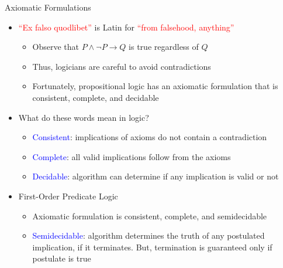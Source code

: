 \documentclass[10pt,english]{beamer}
\begin{document}
\begin{frame}{Axiomatic Formulations}

\begin{itemize}
\setlength\itemsep{3mm}
\item<1-> \textcolor{red}{``Ex falso quodlibet''} is Latin for \textcolor{red}{``from falsehood, anything''} \vspace{1mm}
\begin{itemize}
 \setlength\itemsep{1.5mm}
 \item Observe that $P \wedge \neg P \rightarrow Q$ is true regardless of $Q$
 \item Thus, logicians are careful to avoid contradictions
 \item Fortunately, propositional logic has an axiomatic formulation that is consistent, complete, and decidable
\end{itemize} 

\item<2-> What do these words mean in logic? \vspace{1mm}
\begin{itemize} 
 \setlength\itemsep{1.5mm}
 \item \textcolor{blue}{Consistent}: implications of axioms do not contain a contradiction
 \item \textcolor{blue}{Complete}: all valid implications follow from the axioms
 \item \textcolor{blue}{Decidable}: algorithm can determine if any implication is valid or not
\end{itemize}

\item<3-> First-Order Predicate Logic \vspace{1mm}
\begin{itemize} 
 \setlength\itemsep{1.5mm}
 \item Axiomatic formulation is consistent, complete, and semidecidable
 \item \textcolor{blue}{Semidecidable}:  algorithm determines the truth of any postulated implication, if it terminates.  But, termination is guaranteed only if postulate is true
\end{itemize}
\end{itemize}

\end{frame}
\end{document}

